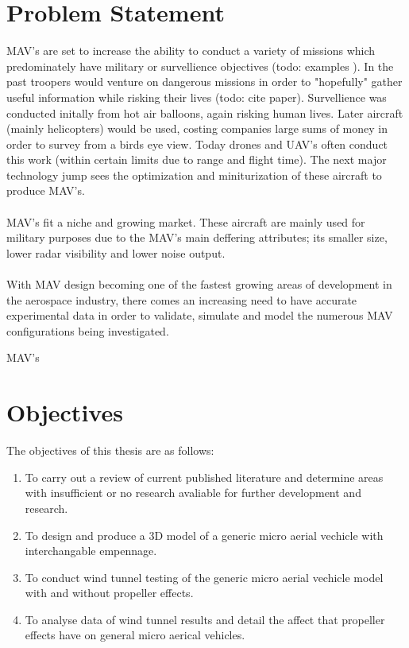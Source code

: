 {\section{Problem Statement}
\label{ProblemStatement}
MAV's are set to increase the ability to conduct a variety of missions which predominately have military or survellience objectives (todo: examples ). In the past troopers would venture on dangerous missions in order to "hopefully" gather useful information while risking their lives (todo: cite paper). Survellience was conducted initally from hot air balloons, again risking human lives. Later aircraft (mainly helicopters) would be used, costing companies large sums of money in order to survey from a birds eye view. Today drones and UAV's often conduct this work (within certain limits due to range and flight time). The next major technology jump sees the optimization and miniturization of these aircraft to produce MAV's. \\
\\
MAV's fit a niche and growing market. These aircraft are mainly used for military purposes due to the MAV's main deffering attributes; its smaller size, lower radar visibility and lower noise output.\\
\\
With MAV design becoming one of the fastest growing areas of development in the aerospace industry, there comes an increasing need to have accurate experimental data in order to validate, simulate and model the numerous MAV configurations being investigated. 

MAV's




\section{Objectives}
\label{sec:Objectives}
The objectives of this thesis are as follows:

\begin{enumerate}
  \item To carry out a review of current published literature and determine areas with insufficient or no research avaliable for further development and research.
  \item To design and produce a 3D model of a generic micro aerial vechicle with interchangable empennage.
  \item To conduct wind tunnel testing of the generic micro aerial vechicle model with and without propeller effects.
  \item To analyse data of wind tunnel results and detail the affect that propeller effects have on general micro aerical vehicles.
\end{enumerate}

}
